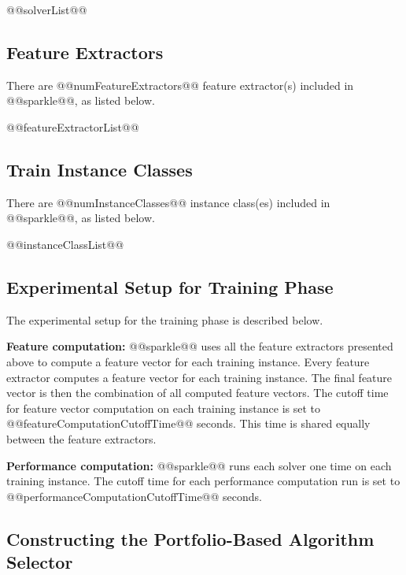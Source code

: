 \documentclass[british]{article}
\begin{document}
\begin{enumerate} 
@@solverList@@
\end{enumerate}

\subsection{Feature Extractors}
\label{sec:Feature_Extractors}
There are @@numFeatureExtractors@@ feature extractor(s) included in @@sparkle@@, as listed below.

\begin{enumerate}
@@featureExtractorList@@
\end{enumerate}

\subsection{Train Instance Classes}
\label{sec:Train_Instance_Classes}
There are @@numInstanceClasses@@ instance class(es) included in @@sparkle@@, as listed below.

\begin{enumerate}
@@instanceClassList@@
\end{enumerate}

\subsection{Experimental Setup for Training Phase}
\label{sec:Experimental_Setup_for_Training_Phase}

The experimental setup for the training phase is described below.

\textbf{Feature computation:} @@sparkle@@ uses all the feature extractors presented above to compute a feature vector for each training instance. Every feature extractor computes a feature vector for each training instance. The final feature vector is then the combination of all computed feature vectors. The cutoff time for feature vector computation on each training instance is set to @@featureComputationCutoffTime@@ seconds. This time is shared equally between the feature extractors.

\textbf{Performance computation:} @@sparkle@@ runs each solver one time on each training instance. The cutoff time for each performance computation run is set to @@performanceComputationCutoffTime@@ seconds.

\subsection{Constructing the Portfolio-Based Algorithm Selector}
\label{sec:Portfolio}
\end{document}

